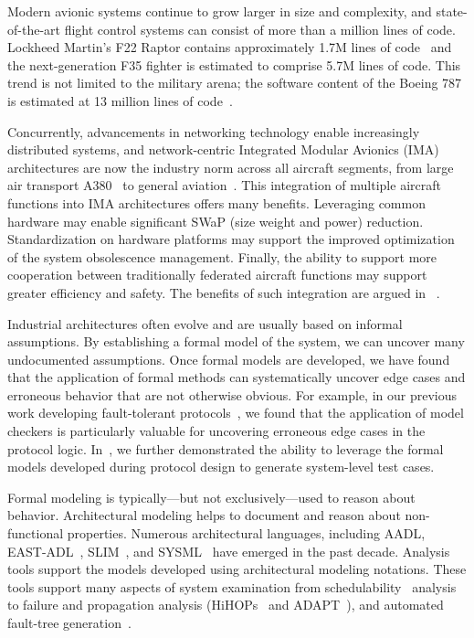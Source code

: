 
Modern avionic systems continue to grow larger in size and complexity, and
state-of-the-art flight control systems can consist of more than a million lines
of code. Lockheed Martin's F22 Raptor contains approximately 1.7M lines of
code~\cite{dvorak2009nasa} and the next-generation F35 fighter is estimated to
comprise 5.7M lines of code.  This trend is not limited to the military arena;
the software content of the Boeing 787 is estimated at 13 million lines of
code~\cite{judas2011historical}.

Concurrently, advancements in networking technology enable increasingly
distributed systems, and network-centric Integrated Modular Avionics (IMA)
architectures are now the industry norm across all aircraft segments, from large
air transport A380~\cite{itier2007a380} to general
aviation~\cite{ananda2009general}.  This integration of multiple aircraft
functions into IMA architectures offers many benefits. Leveraging common
hardware may enable significant SWaP (size weight and power)
reduction. Standardization on hardware platforms may support the improved
optimization of the system obsolescence management. Finally, the ability to
support more cooperation between traditionally federated aircraft functions may
support greater efficiency and safety. The benefits of such integration are
argued in ~\cite{rushby2000partitioning}.


Industrial architectures often evolve and are usually based on informal
assumptions. By establishing a formal model of the system, we can uncover many
undocumented assumptions. Once formal models are developed, we have found that
the application of formal methods can systematically uncover edge cases and
erroneous behavior that are not otherwise obvious. For example, in our previous
work developing fault-tolerant
protocols~\cite{dutertre2012model,driscoll2012maximizing}, we found that the
application of model checkers is particularly valuable for uncovering erroneous
edge cases in the protocol logic. In~\cite{dutertre2012model}, we further
demonstrated the ability to leverage the formal models developed during protocol
design to generate system-level test cases.

Formal modeling is typically---but not exclusively---used to reason about
behavior. Architectural modeling helps to document and reason about
non-functional properties. Numerous architectural languages, including
AADL\cite{feiler2006architecture}, EAST-ADL~\cite{debruyne2005east},
SLIM~\cite{bozzano2009compass}, and SYSML~\cite{friedenthal2011practical} have
emerged in the past decade. Analysis tools support the models developed using
architectural modeling notations. These tools support many aspects of system
examination from schedulability~\cite{singhoff2005scheduling} analysis to
failure and propagation analysis (HiHOPs~\cite{papadopoulos2011engineering} and
ADAPT~\cite{liu2009reliability}), and automated fault-tree
generation~\cite{li2011method,joshi2007automatic}.

